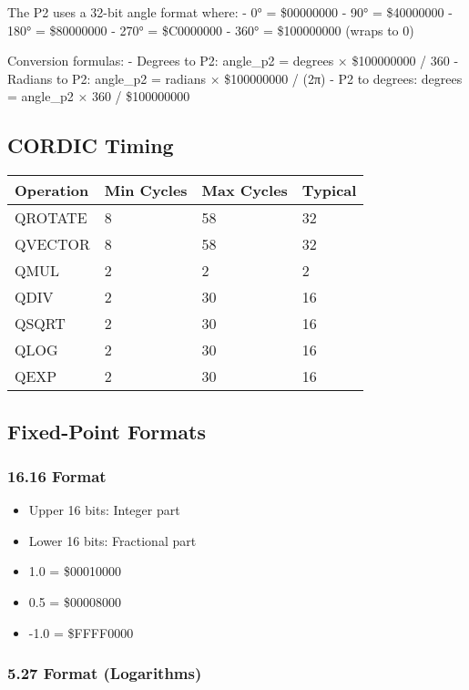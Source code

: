 \documentclass[11pt]{book}
\providecommand{\tightlist}{%
  \setlength{\itemsep}{0pt}\setlength{\parskip}{0pt}}
\begin{document}
The P2 uses a 32-bit angle format where: - 0° = \$00000000 - 90° =
\$40000000 - 180° = \$80000000 - 270° = \$C0000000 - 360° = \$100000000
(wraps to 0)

Conversion formulas: - Degrees to P2: angle\_p2 = degrees × \$100000000
/ 360 - Radians to P2: angle\_p2 = radians × \$100000000 / (2π) - P2 to
degrees: degrees = angle\_p2 × 360 / \$100000000

\hypertarget{cordic-timing}{%
\subsection{CORDIC Timing}\label{cordic-timing}}

\begin{longtable}[]{@{}llll@{}}
\toprule
Operation & Min Cycles & Max Cycles & Typical \\
\midrule
\endhead
QROTATE & 8 & 58 & 32 \\
QVECTOR & 8 & 58 & 32 \\
QMUL & 2 & 2 & 2 \\
QDIV & 2 & 30 & 16 \\
QSQRT & 2 & 30 & 16 \\
QLOG & 2 & 30 & 16 \\
QEXP & 2 & 30 & 16 \\
\bottomrule
\end{longtable}

\hypertarget{fixed-point-formats}{%
\subsection{Fixed-Point Formats}\label{fixed-point-formats}}

\hypertarget{format}{%
\subsubsection{16.16 Format}\label{format}}

\begin{itemize}
\tightlist
\item
  Upper 16 bits: Integer part
\item
  Lower 16 bits: Fractional part
\item
  1.0 = \$00010000
\item
  0.5 = \$00008000
\item
  -1.0 = \$FFFF0000
\end{itemize}

\hypertarget{format-logarithms}{%
\subsubsection{5.27 Format (Logarithms)}\label{format-logarithms}}
\end{document}
